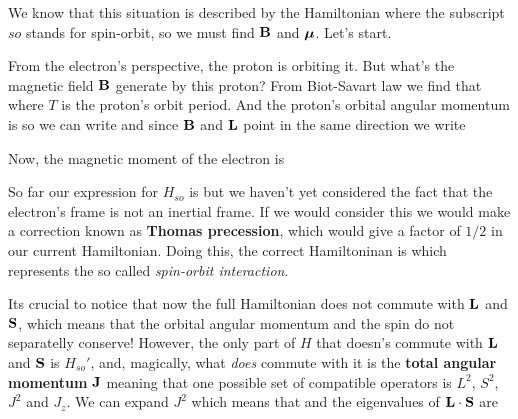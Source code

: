 \documentclass[oneside, 12pt, notitlepage]{book}
\begin{document}
We know that this situation is described by the Hamiltonian
where the subscript \(so\) stands for spin-orbit, so we must find \(\vb{B}\) and \(\bm{\mu}\). Let's start.\par
From the electron's perspective, the proton is orbiting it. But what's the magnetic field \(\vb{B}\) generate by this proton? From Biot-Savart law we find that
where \(T\) is the proton's orbit period. And the proton's orbital angular momentum is
so we can write
and since \(\vb{B}\) and \(\vb{L}\) point in the same direction we write
\par

Now, the magnetic moment of the electron is
\par

So far our expression for \(H_{so}\) is
but we haven't yet considered the fact that the electron's frame is not an inertial frame. If we would consider this we would make a correction known as \textbf{Thomas precession}, which would give a factor of \(1/2\) in our current Hamiltonian. Doing this, the correct Hamiltoninan is
which represents the so called \emph{spin-orbit interaction}.\par

Its crucial to notice that now the full Hamiltonian
does not commute with \(\vb{L}\) and \(\vb{S}\), which means that the orbital angular momentum and the spin do not separatelly conserve! However, the only part of \(H\) that doesn's commute with \(\vb{L}\) and \(\vb{S}\) is \(H_{so}'\), and, magically, what \emph{does} commute with it is the \textbf{total angular momentum} \(\vb{J}\)
meaning that one possible set of compatible operators is \(L^2\), \(S^2\), \(J^2\) and \(J_z\). We can expand \(J^2\)
which means that
and the eigenvalues of \(\vb{L}\cdot\vb{S}\) are
\par
\end{document}
